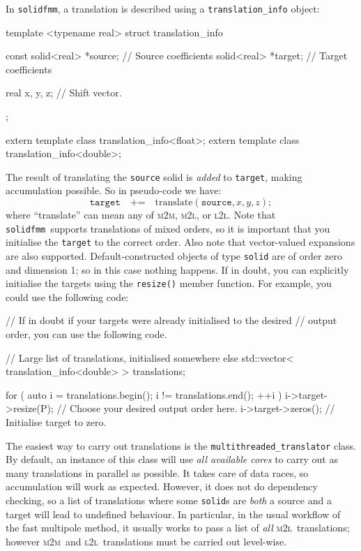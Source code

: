 \documentclass{scrbook}
\newcommand{\solidfmm}{\texttt{solidfmm}}
\newcommand{\MtoM}{\textsc{m2m}}
\newcommand{\MtoL}{\textsc{m2l}}
\newcommand{\LtoL}{\textsc{l2l}}
\begin{document}
In \solidfmm, a translation is described using a \lstinline|translation_info|
object:
\begin{cppcode*}
template <typename real>
struct translation_info
{
    const solid<real> *source;  // Source coefficients
          solid<real> *target;  // Target coefficients

    real x, y, z;               // Shift vector.
};

extern template class translation_info<float>;
extern template class translation_info<double>;
\end{cppcode*}

The result of translating the \lstinline|source| solid is \emph{added} to
\lstinline|target|, making accumulation possible. So in pseudo-code we have:
\begin{equation*}
\texttt{target}\quad\texttt{+=}\quad
\textrm{translate}(\texttt{source},x,y,z);
\end{equation*}
where \enquote{translate} can mean any of \MtoM, \MtoL, or \LtoL. Note that
\solidfmm\ supports translations of mixed orders, so it is important that you
initialise the \lstinline|target| to the correct order. Also note that
vector-valued expansions are also supported. Default-constructed
objects of type \lstinline|solid| are of order zero and dimension 1; so in this
case nothing happens. If in doubt, you can explicitly initialise the targets
using the \lstinline|resize()| member function. For example, you could use the
following code:

\begin{cppcode*}
// If in doubt if your targets were already initialised to the desired
// output order, you can use the following code.

// Large list of translations, initialised somewhere else
std::vector< translation_info<double> > translations;
 
for ( auto i = translations.begin(); i != translations.end(); ++i )
{
	i->target->resize(P); // Choose your desired output order here.
	i->target->zeros();   // Initialise target to zero.
}
\end{cppcode*}

The easiest way to carry out translations is the
\lstinline|multithreaded_translator| class. By default, an instance of this
class will use \emph{all available cores} to carry out as many translations
in parallel as possible. It takes care of data races, so accumulation will work
as expected. However, it does not do dependency checking, so a list of
translations where some \lstinline|solid|s are \emph{both} a source and a
target will lead to undefined behaviour. In particular, in the usual workflow
of the fast multipole method, it usually works to pass a list of \emph{all}
\MtoL\ translations; however \MtoM\ and \LtoL\ translations must be carried out
level-wise.
\end{document}
